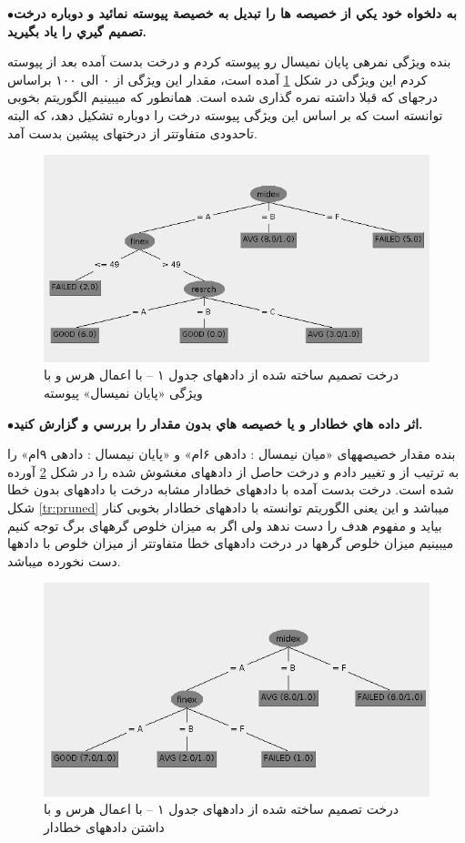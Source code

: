 \documentclass[10pt,a4paper]{article}
\newcommand{\نیمفاصله}{\halfspace}
\renewcommand{\ }{\halfspace}
\newenvironment{q}[1]{\noindent\textbf{$\bullet $\hspace{1em}#1}\par}{\par}
\newcommand{\مق}{\lr}
\newcommand{\فایندس}{\lr{Find-S} }
\begin{document}
\begin{q}{به دلخواه خود يکي از خصيصه ها را تبديل به خصيصة پيوسته نمائيد و دوباره درخت تصميم گيري را ياد بگیرید.}
بنده ویژگی نمره\ ی پایان نمیسال رو پیوسته کردم و درخت بدست آمده بعد از پیوسته کردم این ویژگی در شکل
\ref{tr:continous}
آمده است، مقدار این ویژگی از ۰ الی ۱۰۰ براساس درجه\ ای که قبلا داشته نمره گذاری شده است. همان\ طور که می\ بینیم الگوریتم بخوبی توانسته است که بر اساس این ویژگی پیوسته درخت را دوباره تشکیل دهد،‌ که البته تاحدودی متفاوت\ تر از درخت\ های پیشین بدست آمد.
\begin{figure}[h!]
\centering
\includegraphics[width=.75\textwidth]{continous_pruned}
\caption{درخت تصمیم ساخته شده از داده\ های جدول ۱ -- با اعمال هرس و با ویژگی «پایان نمیسال» پیوسته}\label{tr:continous}
\end{figure}
\end{q}
\newpage
\begin{q}{اثر داده هاي خطادار و يا خصيصه هاي بدون مقدار را بررسي و گزارش کنيد.}
بنده مقدار خصیصه\ های «میان نیمسال : داده\ ی ۶ام» و «پایان نیمسال‌‌ : داده\ ی ۹ام» را به ترتیب از
 و 
تغییر دادم و درخت حاصل از داده\ های مغشوش شده را در شکل
\ref{tr:corrupted}
آورده شده است. درخت بدست آمده با داده\ های خطادار مشابه درخت با داده\ های بدون خطا شکل
\ref{tr:pruned}
می\ باشد و این یعنی الگوریتم توانسته با داده\ های خطادار بخوبی کنار بیاید و مفهوم هدف را دست ندهد ولی اگر به میزان خلوص گره\ های برگ توجه کنیم می\ بینیم  میزان خلوص گره\ ها در درخت داده\ های خطا متفاوت\ تر از میزان خلوص با داده\ ها دست نخورده می\ باشد.
\begin{figure}[h!]
\centering
\includegraphics[width=.75\textwidth]{entity6-9_mid-fin-modify}
\caption{درخت تصمیم ساخته شده از داده\ های جدول ۱ -- با اعمال هرس و با داشتن داده\ های خطادار}\label{tr:corrupted}
\end{figure}
\end{q}
\end{document}
